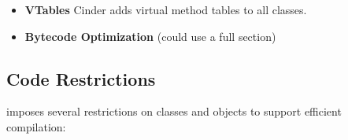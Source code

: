 \documentclass[a4paper,english,cleveref,autoref,thm-restate,anonymous,]{lipics-v2021}
\begin{document}
\begin{itemize}
  \item
    \textbf{VTables}
    Cinder adds virtual method tables to all classes.

  \item
    \textbf{Bytecode Optimization}
    (could use a full section)




\end{itemize}


\subsection{Code Restrictions}

\SP{} imposes several restrictions on classes and objects
to support efficient compilation:
\end{document}
